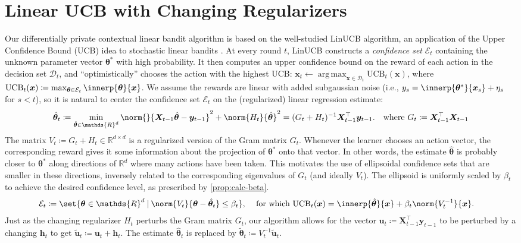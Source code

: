 \documentclass{article}
\renewcommand{\vec}[1]{\bm{#1}}
\newcommand{\defeq}{\coloneq}
\newcommand{\inv}[1]{#1^{-1}}
\newcommand{\Real}{\mathds{R}}
\newcommand{\UCB}{\mathrm{UCB}}
\newcommand{\argmax}{\operatorname*{arg\,max}}
\newcommand\given[1][\delimsize]{%
  \providecommand{\delimsize}{}
  \nonscript\:#1\vert\allowbreak\nonscript\:\mathopen{}
}
\newcommand{\D}{\mathcal{D}}
\newcommand{\E}{\mathcal{E}}
\providecommand\transp{\top}
\let\transpsymbol\transp
\renewcommand{\transp}[1]{#1^\transpsymbol}
\newcommand{\XtX}[1]{\transp{#1}{#1}}
\begin{document}
\section{Linear UCB with Changing Regularizers}
\label{sec:LinUCB}

Our differentially private contextual linear bandit algorithm is based
on the well-studied LinUCB algorithm, an application of the Upper
Confidence Bound (UCB) idea to stochastic linear bandits
\citep{DaniStochasticLinearOptimization2008,RusmevichientongLinearlyParameterizedBandits2010,AbbasiYadkoriImprovedAlgorithmsLinear2011}.
At every round $t$, LinUCB constructs a \emph{confidence set} $\E_t$
containing the unknown parameter vector $\vec\theta^*$ with high
probability.  It then computes an upper confidence bound on the reward
of each action in the decision set $\D_t$, and ``optimistically''
chooses the action with the highest UCB:
$\vec x_t \gets \argmax_{\vec x\in\D_t} \UCB_t(\vec x)$, where
$\UCB_t(\vec x) \defeq \max_{\vec\theta\in\E_t}
\innerp{\vec\theta}{\vec x}$.  We assume the rewards are linear with
added subgaussian noise (i.e.,
$y_s = \innerp{\vec\theta^*}{\vec x_s} + \eta_s$ for $s<t$), so it is
natural to center the confidence set $\E_t$ on the (regularized)
linear regression estimate:
\begin{align*}
  \hat{\vec\theta}_t
  &\defeq \min_{\hat{\vec\theta} \in \Real^d} \norm{}{\vec X_{t-1} \hat{\vec\theta}
    - \vec y_{t-1}}^2 + \norm{H_t}{\hat{\vec\theta}}^2
    = \inv{(G_t + H_t)} \transp{\vec X_{t-1}} \vec y_{t-1}.
    &\text{where } G_t \defeq \XtX{\vec X_{t-1}}
\end{align*}
The matrix $V_t \defeq G_t + H_t \in \Real^{d\times d}$ is a regularized
version of the Gram matrix $G_t$.  Whenever the learner chooses an
action vector, the corresponding reward gives it some information
about the projection of $\vec\theta^*$ onto that vector.  In other
words, the estimate $\hat{\vec\theta}$ is probably closer to
$\vec\theta^*$ along directions of $\Real^d$ where many actions have
been taken.  This motivates the use of ellipsoidal confidence sets
that are smaller in these directions, inversely related to the
corresponding eigenvalues of $G_t$ (and ideally $V_t$). The ellipsoid
is uniformly scaled by $\beta_t$ to achieve the desired confidence
level, as prescribed by \cref{prop:calc-beta}.
\begin{align}\label{eq:def-ellip}
  \E_t &\defeq \set{\vec\theta\in\Real^d \given
        \norm{V_t}{\vec\theta-\hat{\vec\theta}_t} \le \beta_t},
  &\text{ for which }
    \UCB_t(\vec x) &= \innerp{\hat{\vec\theta}}{\vec x} + \beta_t\norm{\inv{V_t}}{\vec x}.
\end{align}
Just as the changing regularizer $H_t$ perturbs the Gram matrix $G_t$,
our algorithm allows for the vector
$\vec u_t \defeq \transp{\vec X_{t-1}} \vec y_{t-1}$ to be perturbed
by a changing $\vec h_t$ to get
$\tilde{\vec u}_t \defeq \vec u_t + \vec h_t$.  The estimate
$\hat{\vec\theta}_t$ is replaced by
$\tilde{\vec\theta}_t \defeq \inv{V_t}\tilde{\vec u}_t$.
\end{document}
